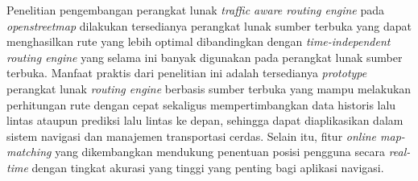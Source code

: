 Penelitian pengembangan perangkat lunak \textit{traffic aware routing engine} pada \textit{openstreetmap} dilakukan tersedianya perangkat lunak sumber terbuka yang dapat menghasilkan rute yang lebih optimal dibandingkan dengan \textit{time-independent routing engine} yang selama ini banyak digunakan pada perangkat lunak sumber terbuka. Manfaat praktis dari penelitian ini adalah tersedianya \textit{prototype} perangkat lunak \textit{routing engine} berbasis sumber terbuka yang mampu melakukan perhitungan rute dengan cepat sekaligus mempertimbangkan data historis lalu lintas ataupun prediksi lalu lintas ke depan, sehingga dapat diaplikasikan dalam sistem navigasi dan manajemen transportasi cerdas. Selain itu, fitur \textit{online map-matching} yang dikembangkan mendukung penentuan posisi pengguna secara \textit{real-time} dengan tingkat akurasi yang tinggi yang penting bagi aplikasi navigasi. 